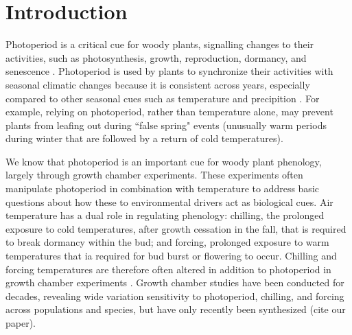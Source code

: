 \documentclass{article}
\begin{document}
\section*{Introduction}
\par  Photoperiod is a critical cue for woody plants, signalling changes to their activities, such as photosynthesis, growth, reproduction, dormancy, and senescence \citep[e.g.,][]{Howe:1996,lagercrantz2009}. Photoperiod is used by plants to synchronize their activities with seasonal climatic changes \citep[e.g.,][]{Hsu:2011,Singh:2017,Basler:2012} because it is consistent across years, especially compared to other seasonal cues such as temperature and precipition \citep{saikkonen2012}. For example, relying on photoperiod, rather than temperature alone, may prevent plants from leafing out during ``false spring" events (unusually warm periods during winter that are followed by a return of cold temperatures). %

\par We know that photoperiod is an important cue for woody plant phenology, largely through growth chamber experiments.  These experiments often manipulate photoperiod in combination with temperature to address basic questions about how these to environmental drivers act as biological cues. Air temperature has a dual role in regulating phenology: chilling, the prolonged exposure to cold temperatures, after growth cessation in the fall, that is required to break dormancy within the bud; and forcing, prolonged exposure to warm temperatures that ia required for bud burst or flowering to occur. Chilling and forcing temperatures are therefore often altered in addition to photoperiod in growth chamber experiments \citep[e.g.,][]{Campbell:1975aa,HEIDE:1977aa,Falusi:1990aa,Spann:2004aa,Laube:2014a}. Growth chamber studies have been conducted for decades, revealing wide variation sensitivity to photoperiod, chilling, and forcing across populations and species, but have only recently been synthesized (cite our paper).
 
\end{document}
